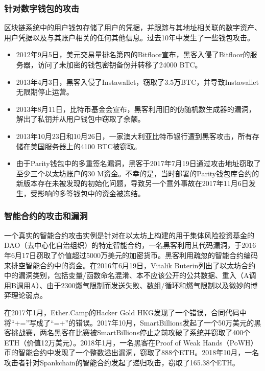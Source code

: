 \begin{translation}
\subsubsection{针对数字钱包的攻击}
区块链系统中的用户钱包存储了用户的凭据，并跟踪与其地址相关联的数字资产、用户凭据以及与其账户相关的任何其他信息。过去10年中发生了一些钱包攻击。

\begin{itemize}
    \item 2012年9月5日，美元交易量排名第四的Bitfloor宣布，黑客入侵了Bitfloor的服务器，访问了未加密的钱包密钥备份并转移了24000 BTC\cite{art60}。
    \item 2013年4月3日，黑客入侵了Instawallet，窃取了3.5万BTC，并导致Instawallet无限期停止运营\cite{art61}。
    \item 2013年8月11日，比特币基金会宣布，黑客利用旧的伪随机数生成器的漏洞，解出了私钥并从用户钱包中窃取了余额\cite{art62}。
    \item 2013年10月23日和10月26日，一家澳大利亚比特币银行遭到黑客攻击，所有存储在美国服务器上的4100 BTC被窃取\cite{art63}。
    \item 由于Parity钱包中的多重签名漏洞，黑客于2017年7月19日通过攻击地址窃取了至少三个以太坊账户的30 M资金\cite{art64}。不幸的是，当时部署的Parity钱包库合约的新版本存在未被发现的初始化问题，导致另一个意外事故在2017年11月6日发生，受影响的多签钱包中的资金被冻结\cite{art65}。
\end{itemize}

\subsubsection{智能合约的攻击和漏洞}
一个真实的智能合约攻击实例是针对在以太坊上构建的用于集体风险投资基金的DAO（去中心化自治组织）的特定智能合约，一名黑客利用其代码漏洞，于2016年6月17日窃取了价值超过5000万美元的加密货币\cite{art66}。黑客利用疏忽的智能合约编码来排空智能合约中的资金\cite{art67}。在2016年6月19日，Vitalik Buterin列出了以太坊合约中的漏洞类别，包括变量/函数命名混淆、本不应该公开的公共数据、重入（A调用B调用A）、由于2300燃气限制而发送失败、数组/循环和燃气限制以及微妙的博弈理论弱点\cite{art68}。

在2017年1月，Ether.Camp的Hacker Gold HKG发现了一个错误，合同代码中将“+=”写成了“=+”的错误\cite{art69}。2017年10月，SmartBillions发起了一个50万美元的黑客挑战赛，两名黑客在比赛被SmartBillions停止之前攻破了系统并窃取了400个ETH（价值12万美元）\cite{art70}。2018年1月，一名黑客在Proof of Weak Hands（PoWH）币的智能合约中发现了一个整数溢出漏洞，窃取了888个ETH\cite{art71}。2018年10月，一名攻击者针对Spankchain的智能合约发起了递归攻击，窃取了165.38个ETH\cite{art72}。


\end{translation}
